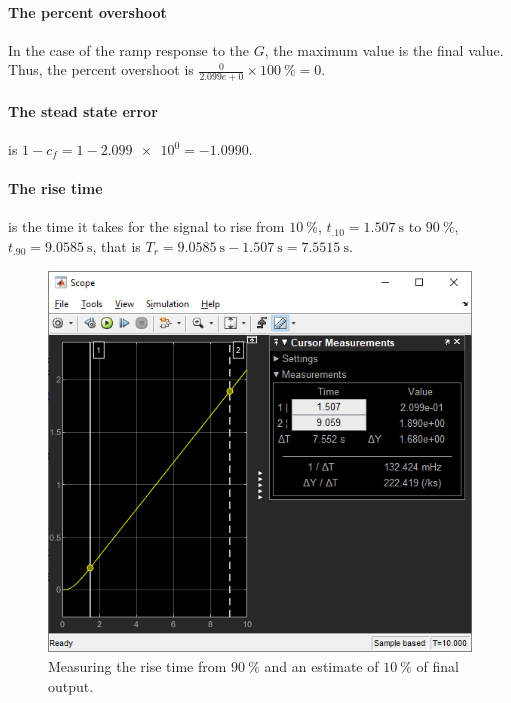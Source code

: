 \documentclass[12pt]{article}
\begin{document}
\paragraph{The percent overshoot}
In the case of the ramp response to the $G$, the maximum value is the final value.
Thus, the percent overshoot is $\frac{0}{2.099e+0} \times \SI{100}\percent = 0$.

\paragraph{The stead state error} is $1 - c_f = 1 - \num{2.099e+0} = -1.0990$.

\paragraph{The rise time} is the time it takes for the signal to rise
from $\SI{10}\percent$, $t_{.10} = \SI{1.507}\second$
to $\SI{90}\percent$, $t_{.90} = \SI{9.0585}\second$,
that is $T_r = \SI{9.0585}\second - \SI{1.507}\second = \SI{7.5515}\second$.

\begin{figure}[h]
    \centering
    \includegraphics[width=\linewidth]{part01b_measuring_rise_time.png}
    \caption{Measuring the rise time from $\SI{90}\percent$ and an estimate of $\SI{10}\percent$ of final output.}
    \label{fig:ramp - measuring rise time}
\end{figure}
\end{document}
